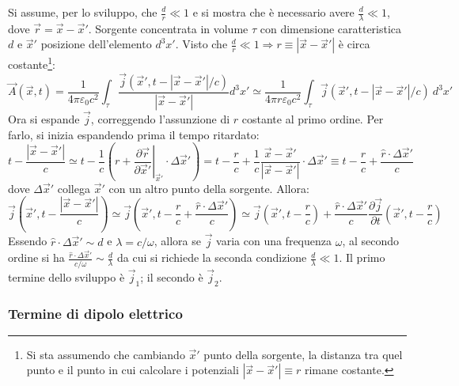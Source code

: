 \documentclass[a4paper]{scrartcl}
\newcommand*\Eval[3]{\left.#1\right\rvert_{#2}^{#3}}
\numberwithin{equation}{subsection}
\theoremstyle{style1}
\begin{document}
Si assume, per lo sviluppo, che $\frac{d}{r}\ll 1$ e si mostra che \`e necessario avere $\frac{d}{\lambda }\ll 1$, dove $\vec{r}=\vec{x}-\vec{x}'$. Sorgente concentrata in volume $\tau $ con dimensione caratteristica $d$ e $\vec{x}'$ posizione dell'elemento $d^3x' $. Visto che $\frac{d}{r}\ll 1\Rightarrow r \equiv\left\lvert \vec{x}-\vec{x}' \right\rvert$ \`e circa costante\footnote{Si sta assumendo che cambiando $\vec{x}'$ punto della sorgente, la distanza tra quel punto e il punto in cui calcolare i potenziali $\left\lvert \vec{x}-\vec{x}' \right\rvert \equiv r$ rimane costante.}:
\[
\vec{A}(\vec{x},t) = \frac{1}{4\pi \varepsilon _0 c^2}\int_{\tau } \frac{\vec{j}(\vec{x}',t - \left\lvert \vec{x}-\vec{x}' \right\rvert / c)}{\left\lvert \vec{x}-\vec{x}' \right\rvert }d^3 x' \simeq\frac{1}{4\pi r \varepsilon _0 c^2}\int_{\tau } \vec{j}(\vec{x}',t - \left\lvert \vec{x}-\vec{x}' \right\rvert / c)\ d^3 x' 
\] 
Ora si espande $\vec{j}$, correggendo l'assunzione di $r$ costante al primo ordine. Per farlo, si inizia espandendo prima il tempo ritardato:
\begin{equation*}
t - \frac{\left\lvert \vec{x}-\vec{x}' \right\rvert }{c}\simeq t - \frac{1}{c} \left(r+ \Eval{\frac{\partial \vec{r}}{\partial \vec{x}'} }{\vec{x}'}{}\cdot \Delta \vec{x}'\right) = t-\frac{r}{c} + \frac{1}{c} \frac{\vec{x}-\vec{x}'}{\left\lvert \vec{x}-\vec{x}' \right\rvert }\cdot \Delta \vec{x}'\equiv t - \frac{r}{c} + \frac{\hat{r}\cdot \Delta \vec{x}'}{c}
\end{equation*}
dove $\Delta \vec{x}'$ collega $\vec{x}'$ con un altro punto della sorgente. Allora:
\begin{equation*}
	\vec{j}\left(\vec{x}', t- \frac{\left\lvert \vec{x}-\vec{x}' \right\rvert }{c}\right) \simeq\vec{j}\left(\vec{x}', t - \frac{r}{c} + \frac{\hat{r}\cdot \Delta \vec{x}'}{c}\right) \simeq \vec{j}\left(\vec{x}', t- \frac{r}{c}\right) + \frac{\hat{r}\cdot \Delta \vec{x}'}{c} \frac{\partial \vec{j}}{\partial t} \left(\vec{x}', t- \frac{r}{c}\right) 
\end{equation*}
Essendo $\hat{r}\cdot \Delta \vec{x}'\sim d$ e $\lambda = c / \omega$, allora se $\vec{j}$ varia con una frequenza $\omega$, al secondo ordine si ha $\frac{\hat{r}\cdot \Delta \vec{x}'}{c / \omega}\sim \frac{d}{\lambda }$ da cui si richiede la seconda condizione $\frac{d}{\lambda }\ll 1$. Il primo termine dello sviluppo \`e $\vec{j}_1$; il secondo \`e $\vec{j}_2$.
\subsubsection{Termine di dipolo elettrico}
\end{document}
